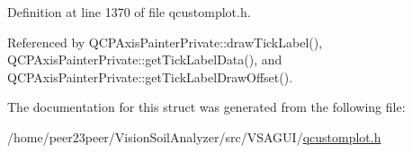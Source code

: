 Definition at line 1370 of file qcustomplot.\+h.



Referenced by Q\+C\+P\+Axis\+Painter\+Private\+::draw\+Tick\+Label(), Q\+C\+P\+Axis\+Painter\+Private\+::get\+Tick\+Label\+Data(), and Q\+C\+P\+Axis\+Painter\+Private\+::get\+Tick\+Label\+Draw\+Offset().



The documentation for this struct was generated from the following file\+:\begin{DoxyCompactItemize}
\item 
/home/peer23peer/\+Vision\+Soil\+Analyzer/src/\+V\+S\+A\+G\+U\+I/\hyperlink{qcustomplot_8h}{qcustomplot.\+h}\end{DoxyCompactItemize}
